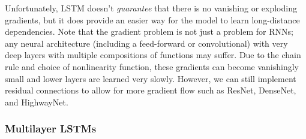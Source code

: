 \documentclass{article}
\begin{document}
    Unfortunately, LSTM doesn't \textit{guarantee} that there is no vanishing or exploding gradients, but it does provide an easier way for the model to learn long-distance dependencies. Note that the gradient problem is not just a problem for RNNs; any neural architecture (including a feed-forward or convolutional) with very deep layers with multiple compositions of functions may suffer. Due to the chain rule and choice of nonlinearity function, these gradients can become vanishingly small and lower layers are learned very slowly. However, we can still implement residual connections to allow for more gradient flow such as ResNet, DenseNet, and HighwayNet. 

    \subsubsection{Multilayer LSTMs}
\end{document}
